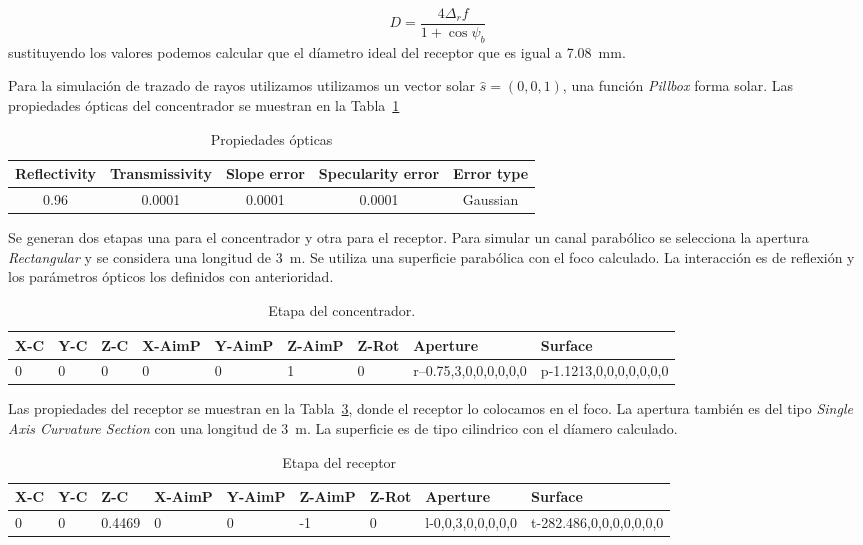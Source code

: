 \begin{equation}
  \label{eq:diametro2}
  D = \dfrac{4 \Delta_r f}{1 + \cos \psi_b}
\end{equation}
sustituyendo los valores podemos calcular que el díametro ideal del receptor que es igual a 7.08~mm.

\ASolution Para la simulación de trazado de rayos utilizamos utilizamos un vector solar $\hat s = (0,0,1)$, una función \emph{Pillbox} forma solar. Las propiedades ópticas del concentrador se muestran en la Tabla~\ref{tab:opticaCanal}


\begin{table}[h]
  \centering
  \begin{tabular}[h]{ccccc}
    \toprule
    Reflectivity & Transmissivity & Slope error & Specularity error & Error type\\
    \midrule
    0.96         & 0.0001         & 0.0001      & 0.0001            & Gaussian\\
    \bottomrule
  \end{tabular}
  \caption{\label{tab:opticaCanal} Propiedades ópticas}
\end{table}

Se generan dos etapas una para el concentrador y otra para el receptor. Para simular un canal parabólico se selecciona la apertura \emph{Rectangular} y se considera una longitud de 3~m. Se utiliza una superficie parabólica con el foco calculado. La interacción es de reflexión y los parámetros ópticos los definidos con anterioridad.

\begin{table}[h]
  \centering
  \scriptsize
  \begin{tabular}[h]{lllllllll}
    \toprule
    X-C & Y-C & Z-C & X-AimP & Y-AimP & Z-AimP & Z-Rot & Aperture & Surface\\
    \midrule
    0 & 0 & 0 & 0 & 0 & 1 & 0 & r--0.75,3,0,0,0,0,0,0 & p-1.1213,0,0,0,0,0,0,0\\
    \bottomrule
  \end{tabular}
  \caption{\label{tab:etapaReceptorD} Etapa del concentrador.}
\end{table}

Las propiedades del receptor se muestran en la Tabla~\ref{tab:etapaRecC}, donde el receptor lo colocamos en el foco. La apertura también es del tipo \emph{Single Axis Curvature Section} con una longitud de 3~m. La superficie es de tipo cilindrico con el díamero calculado.
\begin{table}[h]
  \centering
  \scriptsize
  \begin{tabular}[h]{lllllllll}
    \toprule
    X-C & Y-C & Z-C & X-AimP & Y-AimP & Z-AimP & Z-Rot & Aperture & Surface\\
    \midrule
    0 & 0 & 0.4469 & 0 & 0 & -1 & 0 & l-0,0,3,0,0,0,0,0 & t-282.486,0,0,0,0,0,0,0\\
    \bottomrule
  \end{tabular}
  \caption{\label{tab:etapaRecC} Etapa del receptor }
\end{table}

